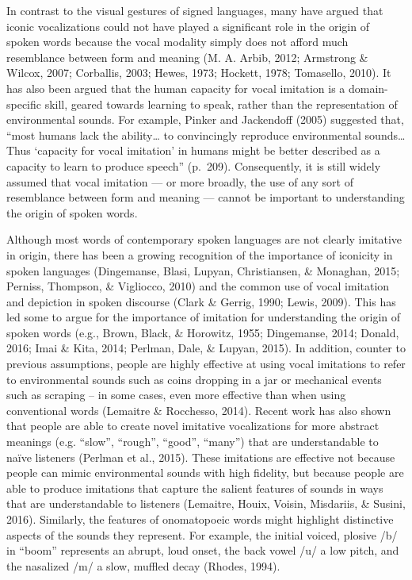 \documentclass[english,floatsintext,man]{apa6}
\theoremstyle{definition}
\theoremstyle{definition}
\theoremstyle{definition}
\theoremstyle{remark}
\begin{document}
In contrast to the visual gestures of signed languages, many have argued
that iconic vocalizations could not have played a significant role in
the origin of spoken words because the vocal modality simply does not
afford much resemblance between form and meaning (M. A. Arbib, 2012;
Armstrong \& Wilcox, 2007; Corballis, 2003; Hewes, 1973; Hockett, 1978;
Tomasello, 2010). It has also been argued that the human capacity for
vocal imitation is a domain-specific skill, geared towards learning to
speak, rather than the representation of environmental sounds. For
example, Pinker and Jackendoff (2005) suggested that, \enquote{most
humans lack the ability\ldots{} to convincingly reproduce environmental
sounds\ldots{} Thus \enquote{capacity for vocal imitation} in humans
might be better described as a capacity to learn to produce speech}
(p.~209). Consequently, it is still widely assumed that vocal imitation
--- or more broadly, the use of any sort of resemblance between form and
meaning --- cannot be important to understanding the origin of spoken
words.

Although most words of contemporary spoken languages are not clearly
imitative in origin, there has been a growing recognition of the
importance of iconicity in spoken languages (Dingemanse, Blasi, Lupyan,
Christiansen, \& Monaghan, 2015; Perniss, Thompson, \& Vigliocco, 2010)
and the common use of vocal imitation and depiction in spoken discourse
(Clark \& Gerrig, 1990; Lewis, 2009). This has led some to argue for the
importance of imitation for understanding the origin of spoken words
(e.g., Brown, Black, \& Horowitz, 1955; Dingemanse, 2014; Donald, 2016;
Imai \& Kita, 2014; Perlman, Dale, \& Lupyan, 2015). In addition,
counter to previous assumptions, people are highly effective at using
vocal imitations to refer to environmental sounds such as coins dropping
in a jar or mechanical events such as scraping -- in some cases, even
more effective than when using conventional words (Lemaitre \&
Rocchesso, 2014). Recent work has also shown that people are able to
create novel imitative vocalizations for more abstract meanings (e.g.
\enquote{slow}, \enquote{rough}, \enquote{good}, \enquote{many}) that
are understandable to naïve listeners (Perlman et al., 2015). These
imitations are effective not because people can mimic environmental
sounds with high fidelity, but because people are able to produce
imitations that capture the salient features of sounds in ways that are
understandable to listeners (Lemaitre, Houix, Voisin, Misdariis, \&
Susini, 2016). Similarly, the features of onomatopoeic words might
highlight distinctive aspects of the sounds they represent. For example,
the initial voiced, plosive /b/ in \enquote{boom} represents an abrupt,
loud onset, the back vowel /u/ a low pitch, and the nasalized /m/ a
slow, muffled decay (Rhodes, 1994).
\end{document}
